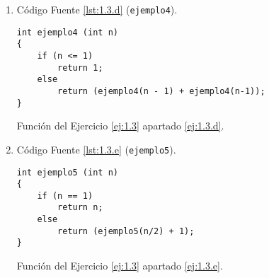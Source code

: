 \begin{ejercicio}
\begin{enumerate}
        \item \label{ej:1.3.d} Código Fuente \ref{lst:1.3.d} (\verb|ejemplo4|).
        \begin{listing}[H]
            \begin{verbatim}
int ejemplo4 (int n)
{
    if (n <= 1)
        return 1;
    else
        return (ejemplo4(n - 1) + ejemplo4(n-1));
}
            \end{verbatim}
            \caption{Función del Ejercicio \ref{ej:1.3} apartado \ref{ej:1.3.d}.}
            \label{lst:1.3.d}
        \end{listing}

        \item \label{ej:1.3.e} Código Fuente \ref{lst:1.3.e} (\verb|ejemplo5|).
        \begin{listing}[H]
            \begin{verbatim}
int ejemplo5 (int n)
{
    if (n == 1)
        return n;
    else
        return (ejemplo5(n/2) + 1);
}
            \end{verbatim}
            \caption{Función del Ejercicio \ref{ej:1.3} apartado \ref{ej:1.3.e}.}
            \label{lst:1.3.e}
        \end{listing}
    \end{enumerate}
\end{ejercicio}


